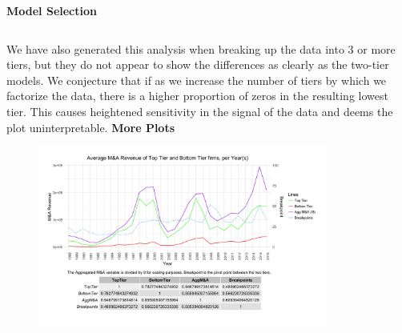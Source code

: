 \documentclass{article}
\begin{document}
{\large \textbf{Model Selection} }
\begin{figure}[H]
\centering
\begin{tabular}{cccc}
\end{tabular}
\end{figure}
We have also generated this analysis when breaking up the data into 3 or more tiers, but they do not appear to show the differences as clearly as the two-tier models. We conjecture that if as we increase the number of tiers by which we factorize the data, there is a higher proportion of zeros in the resulting lowest tier. This causes heightened sensitivity in the signal of the data and deems the plot uninterpretable.
\newpage
{\large \textbf{More Plots} }
\begin{figure}[H]\centering
\includegraphics[width=0.85\textwidth]{../IndivTexOutput/MnADifferences.jpg}\end{figure}

\newpage
\end{document}
